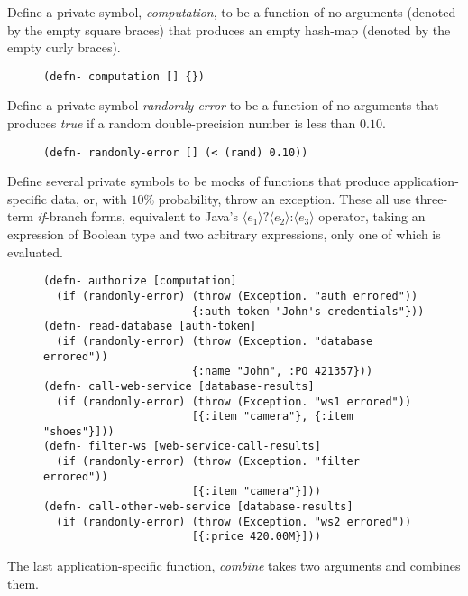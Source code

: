 \documentclass[11pt]{article}
\begin{document}
Define a private symbol, \emph{computation}, to be a function of no
arguments (denoted by the empty square braces) that produces an
empty hash-map (denoted by the empty curly braces).

\begin{figure}[H]
\label{functional-helpers-2}
\begin{verbatim}
(defn- computation [] {})
\end{verbatim}
\end{figure}

Define a private symbol \emph{randomly-error} to be a function of no
arguments that produces \emph{true} if a random double-precision number
is less than $0.10$. 

\begin{figure}[H]
\label{functional-helpers-3}
\begin{verbatim}
(defn- randomly-error [] (< (rand) 0.10))
\end{verbatim}
\end{figure}

Define several private symbols to be mocks of functions that produce
application-specific data, or, with $10\%$ probability, throw an
exception. These all use three-term \emph{if}-branch forms, equivalent to Java's
$\langle{}e_1\rangle{}\texttt{?}\langle{}e_2\rangle{}\texttt{:}\langle{}e_3\rangle{}$
operator, taking an expression of Boolean type and two arbitrary
expressions, only one of which is evaluated.

\begin{figure}[H]
\label{functional-helpers-4}
\begin{verbatim}
(defn- authorize [computation]
  (if (randomly-error) (throw (Exception. "auth errored"))
                       {:auth-token "John's credentials"}))
(defn- read-database [auth-token]
  (if (randomly-error) (throw (Exception. "database errored"))
                       {:name "John", :PO 421357}))
(defn- call-web-service [database-results]
  (if (randomly-error) (throw (Exception. "ws1 errored"))
                       [{:item "camera"}, {:item "shoes"}]))
(defn- filter-ws [web-service-call-results]
  (if (randomly-error) (throw (Exception. "filter errored"))
                       [{:item "camera"}]))
(defn- call-other-web-service [database-results]
  (if (randomly-error) (throw (Exception. "ws2 errored"))
                       [{:price 420.00M}]))
\end{verbatim}
\end{figure}

The last application-specific function, \emph{combine} takes two
arguments and combines them.
\end{document}
